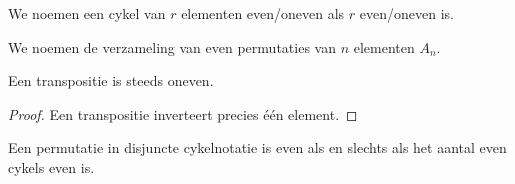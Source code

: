 \documentclass[main.tex]{subfiles}
\begin{document}
\begin{de}
  We noemen een cykel van $r$ elementen even/oneven als $r$ even/oneven is.
\end{de}

\begin{de}
  \label{de:even-permutaties}
  We noemen de verzameling van even permutaties van $n$ elementen $A_{n}$.
\end{de}

\begin{st}
  Een transpositie is steeds oneven.
  \begin{proof}
    Een transpositie inverteert precies \'e\'en element.
  \end{proof}
\end{st}

\begin{st}
  \label{st:even-asa-aantal-even-cykels-even}
  Een permutatie in disjuncte cykelnotatie is even als en slechts als het aantal even cykels even is.

\end{st}
\end{document}
